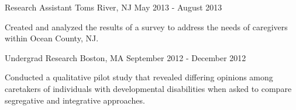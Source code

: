 \begin{cventries}
    {Research Assistant}
    {Toms River, NJ}
    {May 2013 - August 2013}
    {\begin{cvitems}
        \item{Created and analyzed the results of a 
            {survey} to address the needs of caregivers within Ocean County, NJ.}
    \end{cvitems}}
    \vspace*{0.2cm}
    
    {Undergrad Research}
    {Boston, MA}
    {September 2012 - December 2012}
    {\begin{cvitems}
        \item{Conducted a qualitative 
            {pilot study} that revealed differing opinions among caretakers of
            individuals with developmental disabilities when asked to compare
            segregative and integrative approaches.}
    \end{cvitems}}

\vspace*{-0.2cm}
\end{cventries}
